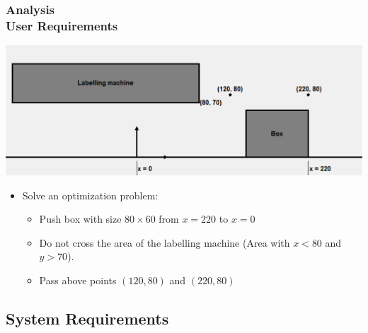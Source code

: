 \documentclass[ucs,10pt]{beamer}
\begin{document}
\begin{frame}
\frametitle{Analysis \\
	\small \color{rwth-blue} User Requirements}
	\begin{center}
		\includegraphics[width=0.75\linewidth]{./Figures/optimization_problem.png}
	\end{center}
	\begin{itemize}
			\item Solve an optimization problem:
			\begin{itemize}
				\item Push box with size $80\times60$ from $x=220$ to $x=0$
				\item Do not cross the area of the labelling machine (Area with $x<80$ and $y>70$).
				\item Pass above points $(120, 80)$ and $(220, 80)$
			\end{itemize}
	\end{itemize}
\end{frame}


\subsection{System Requirements}
\end{document}
